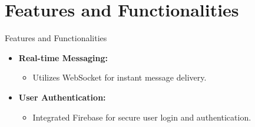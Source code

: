 \documentclass{beamer}
\begin{document}

\section{Features and Functionalities}

\begin{frame}{Features and Functionalities}
    \begin{itemize}
        \item \textbf{Real-time Messaging:}
        \begin{itemize}
            \item Utilizes WebSocket for instant message delivery.
        \end{itemize}
        \item \textbf{User Authentication:}
        \begin{itemize}
            \item Integrated Firebase for secure user login and authentication.
        \end{itemize}
    \end{itemize}
\end{frame}
\end{document}
